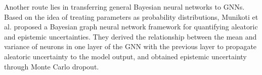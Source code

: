  Another route lies in transferring general Bayesian neural networks to GNNs. Based on the idea of treating parameters as probability distributions, Munikoti et al. \cite{munikoti2023general} proposed a Bayesian graph neural network framework for quantifying aleatoric and epistemic uncertainties. They derived the relationship between the mean and variance of neurons in one layer of the GNN with the previous layer to propagate aleatoric uncertainty to the model output, and obtained epistemic uncertainty through Monte Carlo dropout.





